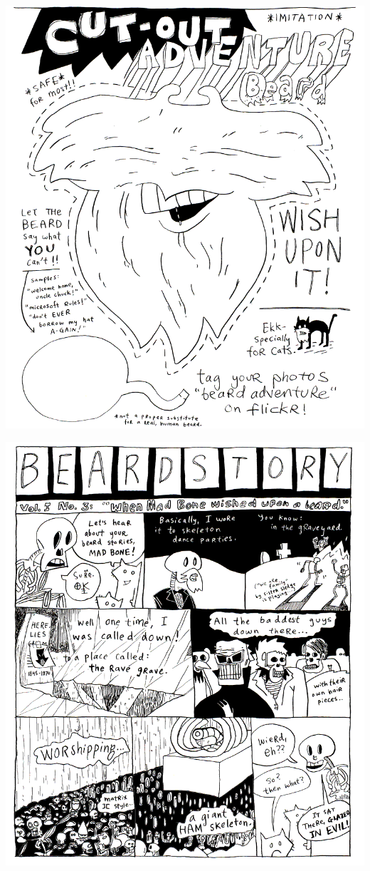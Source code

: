 \documentclass[10pt,twoside]{report}
\begin{document}
\vspace*{0.6cm} \includegraphics[width=1.0\textwidth]{cache/98.png}
\newpage

\vspace*{0.6cm} \includegraphics[width=1.0\textwidth]{cache/99.png}
\newpage
\end{document}
